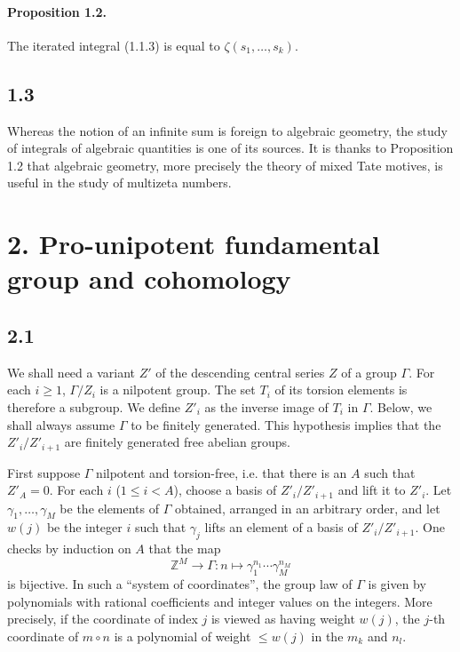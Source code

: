 \documentclass[11pt]{article}
\newcommand{\Z}{\mathbb Z}
\begin{document}
\paragraph{Proposition 1.2.}
The iterated integral (1.1.3) is equal to $\zeta(s_1,\ldots,s_k)$.

\subsection*{1.3}
Whereas the notion of an infinite sum is foreign to algebraic geometry, the study of integrals of algebraic quantities is one of its sources.
It is thanks to Proposition 1.2 that algebraic geometry, more precisely the theory of mixed Tate motives, is useful in the study of multizeta numbers.

\section*{2. Pro-unipotent fundamental group and cohomology}

\subsection*{2.1}
We shall need a variant $Z'$ of the descending central series $Z$ of a group $\Gamma$.
For each $i\geq1$, $\Gamma/Z_i$ is a nilpotent group.
The set $T_i$ of its torsion elements is therefore a subgroup.
We define $Z'_i$ as the inverse image of $T_i$ in $\Gamma$.
Below, we shall always assume $\Gamma$ to be finitely generated.
This hypothesis implies that the $Z'_i/Z'_{i+1}$ are finitely generated free abelian groups.

First suppose $\Gamma$ nilpotent and torsion-free, i.e. that there is an $A$ such that $Z'_A=0$.
For each $i$ ($1\leq i<A$), choose a basis of $Z'_i/Z'_{i+1}$ and lift it to $Z'_i$.
Let $\gamma_1,\ldots,\gamma_M$ be the elements of $\Gamma$ obtained, arranged in an arbitrary order, and let $w(j)$ be the integer $i$ such that $\gamma_j$ lifts an element of a basis of $Z'_i/Z'_{i+1}$.
One checks by induction on $A$ that the map
\[
 \Z^M\longrightarrow \Gamma: n\longmapsto \gamma_1^{n_1}\cdots\gamma_M^{n_M}
\]
is bijective.
In such a ``system of coordinates'', the group law of $\Gamma$ is given by polynomials with rational coefficients and integer values on the integers.
More precisely, if the coordinate of index $j$ is viewed as having weight $w(j)$, the $j$-th coordinate of $m\circ n$ is a polynomial of weight $\leq w(j)$ in the $m_k$ and $n_l$.
\end{document}
